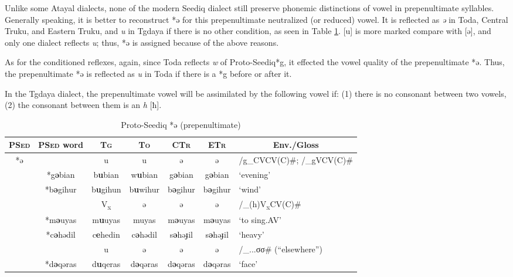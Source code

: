 \documentclass[12pt]{article}
\newcommand{\psed}{\textsc{PSed}\xspace}
\newcommand{\psedf}{Proto-Seediq\xspace}
\newcommand{\stg}{\textsc{Tg}\xspace}
\newcommand{\stgf}{Tgdaya\xspace}
\newcommand{\sto}{\textsc{To}\xspace}
\newcommand{\stof}{Toda\xspace}
\newcommand{\sctr}{\textsc{CTr}\xspace}
\newcommand{\sctrf}{Central Truku\xspace}
\newcommand{\setr}{\textsc{ETr}\xspace}
\newcommand{\setrf}{Eastern Truku\xspace}
\begin{document}
Unlike some Atayal dialects, none of the modern Seediq dialect still preserve phonemic distinctions of vowel in prepenultimate syllables. Generally speaking, it is better to reconstruct *ə for this prepenultimate neutralized (or reduced) vowel. It is reflected as \textit{ə} in \stof, \sctrf, and \setrf, and \textit{u} in \stgf if there is no other condition, as seen in Table \ref{tab:ppschwa}. [u] is more marked compare with [ə], and only one dialect reflects \textit{u}; thus, *ə is assigned because of the above reasons. 

As for the conditioned reflexes, again, since \stof reflects \textit{w} of \psedf *g, it effected the vowel quality of the prepenultimate *ə. Thus, the prepenultimate *ə is reflected as \textit{u} in \stof if there is a *g before or after it. 

In the \stgf dialect, the prepenultimate vowel will be assimilated by the following vowel if: (1) there is no consonant between two vowels, (2) the consonant between them is an \textit{h} [ħ]. 

\begin{table}[!htbp]
\centering
\caption{Proto-Seediq *ə (prepenultimate)}
\label{tab:ppschwa}
\begin{tabular}{c|c|cccc|l}
\textbf{\psed} & \textbf{\psed word}      & \textbf{\stg} & \textbf{\sto} & \textbf{\sctr} & \textbf{\setr} & \multicolumn{1}{c}{\textbf{Env./Gloss}} \\ \hline
\multirow{8}{*}{*ə} & & u                  & u                  & ə                  & ə                  & /g\_CVCV(C)\#; /\_gVCV(C)\#       \\ \cline{2-7}
                    & *g\textbf{ə}bian & b\textbf{u}bian & w\textbf{u}bian & g\textbf{ə}bian & g\textbf{ə}bian & `evening' \\ 
                    & *b\textbf{ə}gihur & b\textbf{u}gihun & b\textbf{u}wihur & b\textbf{ə}gihur & b\textbf{ə}gihur & `wind' \\ \cline{2-7}
                    & & V\textsubscript{x} & ə                  & ə                  & ə                  & /\_(h)V\textsubscript{x}CV(C)\#   \\ \cline{2-7}
                    & *m\textbf{ə}uyas & m\textbf{u}uyas & muyas & m\textbf{ə}uyas & m\textbf{ə}uyas & `to sing.AV' \\ 
                    & *c\textbf{ə}hədil & c\textbf{e}hedin & c\textbf{ə}hədil & s\textbf{ə}həɟil & s\textbf{ə}həɟil & `heavy' \\ \cline{2-7}
                    & & u                  & ə                  & ə                  & ə                  & /\_...σσ\# (``elsewhere'')                      \\ \cline{2-7}
& *d\textbf{ə}qəras & d\textbf{u}qeras & d\textbf{ə}qəras & d\textbf{ə}qəras & d\textbf{ə}qəras & `face' \\ \hline
                
\end{tabular}
\end{table}
\end{document}
